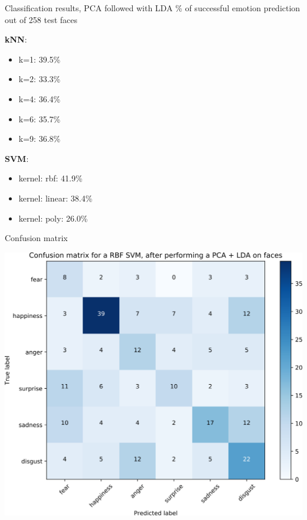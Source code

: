 \documentclass[compress]{beamer}
\begin{document}
\begin{frame}{Classification results, PCA followed with LDA}
    \% of successful emotion prediction out of 258 test faces

    {\bf kNN}:
    \begin{itemize}
        \item k=1: 39.5\%
        \item k=2: 33.3\%
        \item k=4: 36.4\%
        \item k=6: 35.7\%
        \item k=9: 36.8\%
    \end{itemize}

    {\bf SVM}:

    \begin{itemize}
        \item kernel: rbf: 41.9\%
        \item kernel: linear: 38.4\%
        \item kernel: poly: 26.0\%
    \end{itemize}
\end{frame}

\begin{frame}{Confusion matrix}
    \begin{center}
        \includegraphics[width=0.8\linewidth]{confusion_matrix_image_pca_lda_svm}
    \end{center}
\end{frame}
\end{document}
